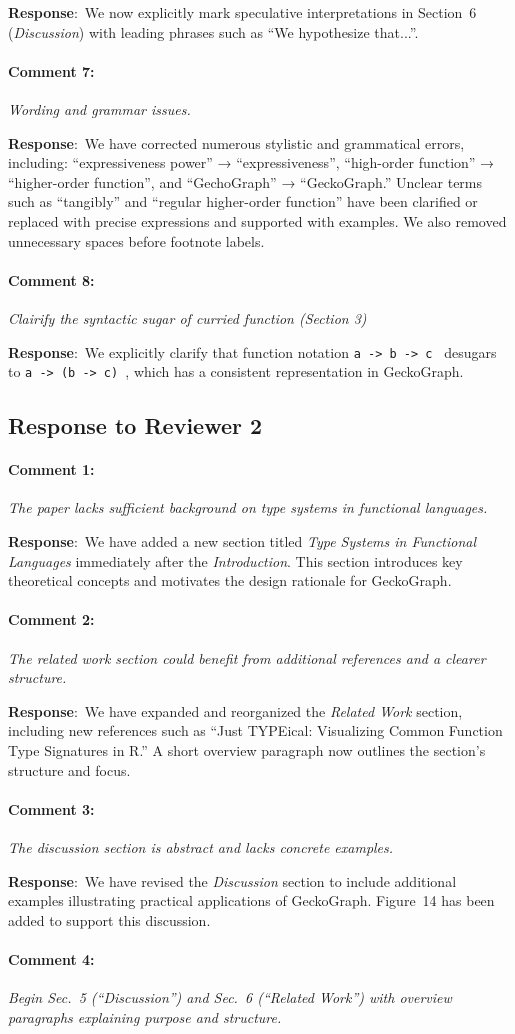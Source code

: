 \documentclass{article}
\newcommand{\pointRaised}[2]{\medskip \noindent 
               \paragraph{#1} \textsl{#2}}
\newcommand{\reply}{\noindent \textbf{Response}:\ }
\begin{document}
\reply We now explicitly mark speculative interpretations in Section~6 (\textit{Discussion}) with leading phrases such as “We hypothesize that...”.

\pointRaised{Comment 7:}{Wording and grammar issues.}

\reply We have corrected numerous stylistic and grammatical errors, including:
“expressiveness power” → “expressiveness”,
“high-order function” → “higher-order function”,
and “GechoGraph” → “GeckoGraph.”  
Unclear terms such as “tangibly” and “regular higher-order function” have been clarified or replaced with precise expressions and supported with examples.  
We also removed unnecessary spaces before footnote labels.

\pointRaised{Comment 8:}{Clairify the syntactic sugar of curried function (Section 3)}

\reply We explicitly clarify that function notation \texttt{a -> b -> c } desugars to \texttt{a -> (b -> c) }, which has a consistent representation in GeckoGraph.

\subsection*{Response to Reviewer 2}

\pointRaised{Comment 1:}{The paper lacks sufficient background on type systems in functional languages.}

\reply We have added a new section titled \textit{Type Systems in Functional Languages} immediately after the \textit{Introduction}. This section introduces key theoretical concepts and motivates the design rationale for GeckoGraph.

\pointRaised{Comment 2:}{The related work section could benefit from additional references and a clearer structure.}

\reply We have expanded and reorganized the \textit{Related Work} section, including new references such as “Just TYPEical: Visualizing Common Function Type Signatures in R.” A short overview paragraph now outlines the section’s structure and focus.

\pointRaised{Comment 3:}{The discussion section is abstract and lacks concrete examples.}

\reply We have revised the \textit{Discussion} section to include additional examples illustrating practical applications of GeckoGraph. Figure~14 has been added to support this discussion.

\pointRaised{Comment 4:}{Begin Sec.~5 (“Discussion”) and Sec.~6 (“Related Work”) with overview paragraphs explaining purpose and structure.}
\end{document}
